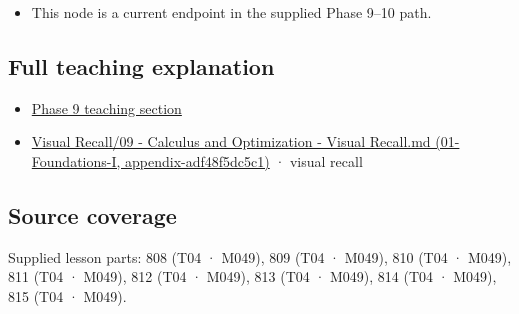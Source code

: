 \begin{itemize}
\tightlist
\item
  This node is a current endpoint in the supplied Phase 9--10 path.
\end{itemize}

\subsection{Full teaching explanation}\label{full-teaching-explanation}

\begin{itemize}
\tightlist
\item
  \href{Continuous\%20Notes/Computing\%20Foundations\%20-\%20From\%20Bits\%20to\%20C++\%20and\%20Systems\%20APIs\#Functions,\%20limits,\%20continuity,\%20and\%20scalar\%20change}{Phase 9 teaching section}
\item
  \href{}{Visual Recall/09 - Calculus and Optimization - Visual Recall.md (01-Foundations-I, appendix-adf48f5dc5c1)} · visual recall
\end{itemize}

\subsection{Source coverage}\label{source-coverage}

Supplied lesson parts: 808 (T04 · M049), 809 (T04 · M049), 810 (T04 · M049), 811 (T04 · M049), 812 (T04 · M049), 813 (T04 · M049), 814 (T04 · M049), 815 (T04 · M049).
